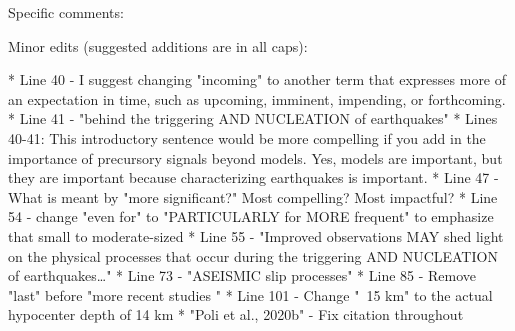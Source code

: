 \documentclass[10pt]{extarticle}
\begin{document}
Specific comments:





Minor edits (suggested additions are in all caps):


*        Line 40 - I suggest changing "incoming" to another term that expresses more of an expectation in time, such as upcoming, imminent, impending, or forthcoming.  
*        Line 41 - "behind the triggering AND NUCLEATION of earthquakes"
*        Lines 40-41: This introductory sentence would be more compelling if you add in the importance of precursory signals beyond models. Yes, models are important, but they are important because characterizing earthquakes is important.
*        Line 47 - What is meant by "more significant?" Most compelling? Most impactful?
*        Line 54 -  change "even for" to "PARTICULARLY for MORE frequent" to emphasize that small to moderate-sized %
*        Line 55 - "Improved observations MAY shed light on the physical processes that occur during the triggering AND NUCLEATION of earthquakes…"
*        Line 73 - "ASEISMIC slip processes"
*        Line 85 - Remove "last" before "more recent studies "
*        Line 101 - Change "~15 km" to the actual hypocenter depth of 14 km
*        "Poli et al., 2020b" - Fix citation throughout





\end{document}
